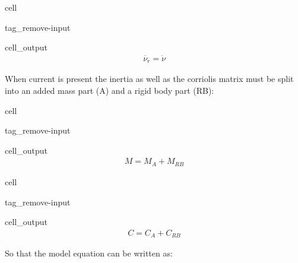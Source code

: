 \documentclass[review]{elsarticle}
\begin{document}
\begin{sphinxuseclass}{cell}
\begin{sphinxuseclass}{tag_remove-input}
\begin{sphinxuseclass}{cell_output}\begin{equation*}
\begin{split}\displaystyle \dot{\nu_r} = \dot{\nu}\end{split}
\end{equation*}
\end{sphinxuseclass}
\end{sphinxuseclass}
\end{sphinxuseclass}
\sphinxAtStartPar
When current is present the inertia as well as the corriolis matrix must be split into an added mass part (A) and a rigid body part (RB):

\begin{sphinxuseclass}{cell}
\begin{sphinxuseclass}{tag_remove-input}
\begin{sphinxuseclass}{cell_output}\begin{equation*}
\begin{split}\displaystyle M = M_{A} + M_{RB}\end{split}
\end{equation*}
\end{sphinxuseclass}
\end{sphinxuseclass}
\end{sphinxuseclass}
\begin{sphinxuseclass}{cell}
\begin{sphinxuseclass}{tag_remove-input}
\begin{sphinxuseclass}{cell_output}\begin{equation*}
\begin{split}\displaystyle C = C_{A} + C_{RB}\end{split}
\end{equation*}
\end{sphinxuseclass}
\end{sphinxuseclass}
\end{sphinxuseclass}
\sphinxAtStartPar
So that the model equation can be written as:
\end{document}
